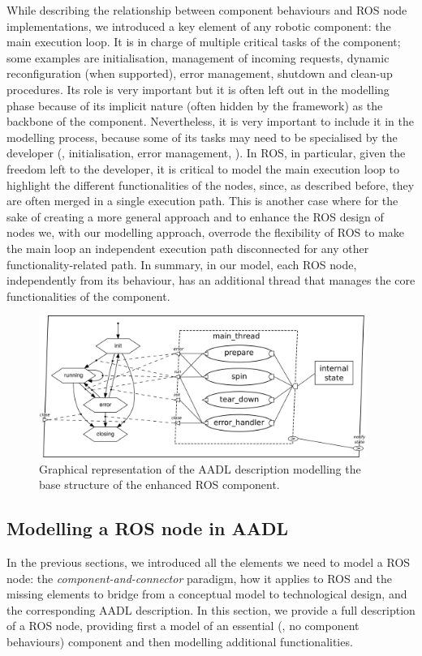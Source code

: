 While describing the relationship between component behaviours and ROS node implementations, we introduced a key element of any robotic component: the main execution loop. It is in charge of multiple critical tasks of the component; some examples are initialisation, management of incoming requests, dynamic reconfiguration (when supported), error management, shutdown and clean-up procedures. Its role is very important but it is often left out in the modelling phase because of its implicit nature (often hidden by the framework) as the backbone of the component. Nevertheless, it is very important to include it in the modelling process, because some of its tasks may need to be specialised by the developer (\eg, initialisation, error management, \etc). In ROS, in particular, given the freedom left to the developer, it is critical to model the main execution loop to highlight the different functionalities of the nodes, since, as described before, they are often merged in a single execution path. This is another case where for the sake of creating a more general approach and to enhance the ROS design of nodes we, with our modelling approach, overrode the flexibility of ROS to make the main loop an independent execution path disconnected for any other functionality-related path. In summary, in our model, each ROS node, independently from its behaviour, has an additional thread that manages the core functionalities of the component.

\begin{figure}[t]
    \centering
    \includegraphics[width=0.95\textwidth]{gfx/essential}
    \caption{Graphical representation of the AADL description modelling the base structure of the enhanced ROS component.}\label{fig:essential}
\end{figure}

\subsection{Modelling a ROS node in AADL}
\label{sec:ros-in-aadl}
In the previous sections, we introduced all the elements we need to model a ROS node: the \textit{component-and-connector} paradigm, how it applies to ROS and the missing elements to bridge from a conceptual model to technological design, and the corresponding AADL description. In this section, we provide a full description of a ROS node, providing first a model of an essential (\ie, no component behaviours) component and then modelling additional functionalities.

